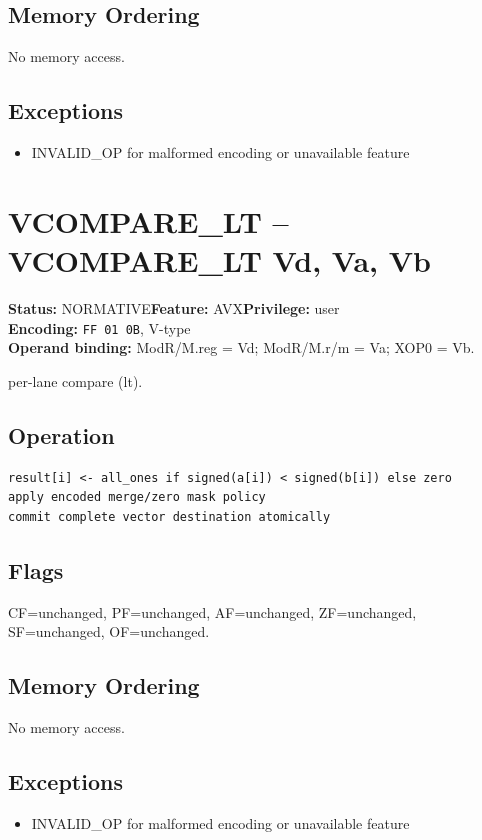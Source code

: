 \documentclass[10pt]{article}
\begin{document}
\subsection*{Memory Ordering}
No memory access.
\subsection*{Exceptions}
\begin{itemize}
\item INVALID\_OP for malformed encoding or unavailable feature
\end{itemize}
\clearpage

\section{VCOMPARE\_LT -- VCOMPARE\_LT Vd, Va, Vb}
\textbf{Status:} NORMATIVE\quad \textbf{Feature:} AVX\quad \textbf{Privilege:} user\\
\textbf{Encoding:} \texttt{FF 01 0B}, V-type\\
\textbf{Operand binding:} ModR/M.reg = Vd; ModR/M.r/m = Va; XOP0 = Vb.

per-lane compare (lt).

\subsection*{Operation}
\begin{lstlisting}
result[i] <- all_ones if signed(a[i]) < signed(b[i]) else zero
apply encoded merge/zero mask policy
commit complete vector destination atomically
\end{lstlisting}
\subsection*{Flags}
CF=unchanged, PF=unchanged, AF=unchanged, ZF=unchanged, SF=unchanged, OF=unchanged.
\subsection*{Memory Ordering}
No memory access.
\subsection*{Exceptions}
\begin{itemize}
\item INVALID\_OP for malformed encoding or unavailable feature
\end{itemize}
\clearpage
\end{document}
